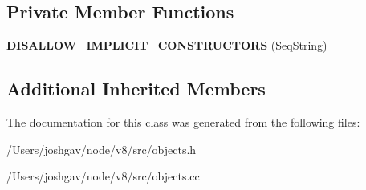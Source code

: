 \subsection*{Private Member Functions}
\begin{DoxyCompactItemize}
\item 
{\bfseries D\+I\+S\+A\+L\+L\+O\+W\+\_\+\+I\+M\+P\+L\+I\+C\+I\+T\+\_\+\+C\+O\+N\+S\+T\+R\+U\+C\+T\+O\+RS} (\hyperlink{classv8_1_1internal_1_1_seq_string}{Seq\+String})\hypertarget{classv8_1_1internal_1_1_seq_string_a84841723ca39db60949a41c7c05cb317}{}\label{classv8_1_1internal_1_1_seq_string_a84841723ca39db60949a41c7c05cb317}

\end{DoxyCompactItemize}
\subsection*{Additional Inherited Members}


The documentation for this class was generated from the following files\+:\begin{DoxyCompactItemize}
\item 
/\+Users/joshgav/node/v8/src/objects.\+h\item 
/\+Users/joshgav/node/v8/src/objects.\+cc\end{DoxyCompactItemize}
